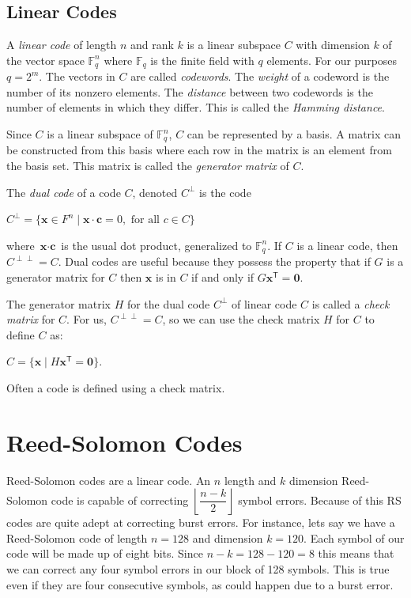 \documentclass{article}
\begin{document}
\subsection{Linear Codes}
A \textit{linear code} of length $n$ and rank $k$ is a linear subspace $C$ with dimension $k$ of the vector space $\mathbb{F}^{n}_{q}$ where $\mathbb{F}_{q}$ is the finite field with $q$ elements. For our purposes $q = 2^m$. The vectors in $C$ are called \textit{codewords}. The \textit{weight} of a codeword is the number of its nonzero elements. The \textit{distance} between two codewords is the number of elements in which they differ. This is called the \textit{Hamming distance}.

Since $C$ is a linear subspace of $\mathbb{F}^{n}_{q}$, $C$ can be represented by a basis. A matrix can be constructed from this basis where each row in the matrix is an element from the basis set. This matrix is called the \textit{generator matrix} of $C$.

The \textit{dual code} of a code $C$, denoted $C^{\perp}$ is the code
\begin{center}
$C^{\perp} = \{\textbf{x} \in F^{n} \mid \textbf{x} \cdot \textbf{c} = 0, \text{ for all } c \in C\}$
\end{center}
where $\textbf{x} \cdot \textbf{c}$ is the usual dot product, generalized to $\mathbb{F}_{q}^{n}$. If $C$ is a linear code, then $C^{\perp \perp} = C$. Dual codes are useful because they possess the property that if $G$ is a generator matrix for $C$ then $\textbf{x}$ is in $C$ if and only if $G\textbf{x}^{\mathsf{T}} = \textbf{0}$.

The generator matrix $H$ for the dual code $C^{\perp}$ of linear code $C$ is called a \textit{check matrix} for $C$. For us, $C^{\perp \perp} = C$, so we can use the check matrix $H$ for $C$ to define $C$ as:
\begin{center}
$C = \{\textbf{x} \mid H\textbf{x}^{\mathsf{T}} = \textbf{0}\}$.
\end{center}
Often a code is defined using a check matrix. %

\section{Reed-Solomon Codes}
Reed-Solomon codes are a linear code. An $n$ length and $k$ dimension Reed-Solomon code is capable of correcting $\left \lfloor{\dfrac{n - k}{2}}\right \rfloor$ symbol errors. Because of this RS codes are quite adept at correcting burst errors. For instance, lets say we have a Reed-Solomon code of length $n = 128$ and dimension $k = 120$. Each symbol of our code will be made up of eight bits. Since $n - k = 128 - 120 = 8$ this means that we can correct any four symbol errors in our block of 128 symbols. This is true even if they are four consecutive symbols, as could happen due to a burst error.
\end{document}

